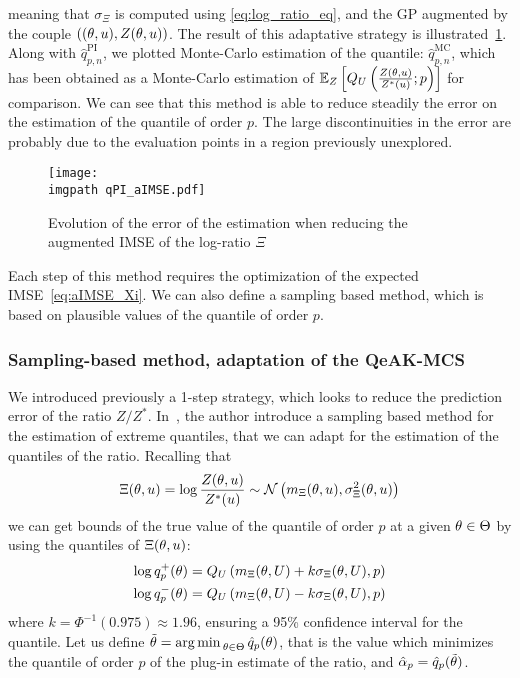 \documentclass[../../Main_ManuscritThese.tex]{subfiles}
\newcommand\imgpath{/home/victor/acadwriting/Manuscrit/Text/Chapter4/img/}
\begin{document}
meaning that $\sigma_{\Xi}$ is computed using \cref{eq:log_ratio_eq},
and the GP augmented by the couple
$\left((\theta, u), Z(\theta, u)\right)$.  The result of this adaptative
strategy is illustrated~\cref{fig:qPI_aIMSE}. Along with
$\hat{q}_{p,n}^{\mathrm{PI}}$, we plotted Monte-Carlo estimation of
the quantile: $\hat{q}_{p,n}^{\mathrm{MC}}$, which has been obtained
as a Monte-Carlo estimation of
$\mathbb{E}_{Z}\left[Q_{U}\left(\frac{Z(\theta,
      u)}{Z^*(u)};p\right)\right]$ for comparison.  We can see that
this method is able to reduce steadily the error on the estimation of
the quantile of order $p$. The large discontinuities in the error are
probably due to the evaluation points in a region previously
unexplored.
\begin{figure}[ht]
  \centering
  \texttt{[image: \\imgpath qPI\_aIMSE.pdf]}
  \caption{\label{fig:qPI_aIMSE} Evolution of the error of the estimation when reducing the augmented IMSE of the log-ratio $\Xi$}
\end{figure}

Each step of this method requires the optimization of the expected
IMSE~\cref{eq:aIMSE_Xi}. We can also define a sampling based method,
which is based on plausible values of the quantile of order $p$.

\subsubsection{Sampling-based method, adaptation of the QeAK-MCS}
\label{ssec:quantile_qeakmcs}
We introduced previously a 1-step strategy, which looks to reduce the
prediction error of the ratio
$Z/Z^*$. In~\cite{razaaly_rare_2019,razaaly_quantile-based_2020}, the
author introduce a sampling based method for the estimation of extreme
quantiles, that we can adapt for the estimation of the quantiles of
the ratio.  Recalling that
\begin{equation}
  \Xi(\theta, u) = \log\frac{Z(\theta, u)}{Z^*(u)} \sim \mathcal{N}\left(m_{\Xi}(\theta, u),\sigma^2_{\Xi}(\theta, u)\right)
\end{equation}
we can get bounds of the true value of the quantile of order $p$ at a
given $\theta\in\Theta$ by using the quantiles of $\Xi(\theta, u)$:
\begin{align}
  \log q_p^{+}(\theta) = Q_{U}\left(m_{\Xi}(\theta, U) + k \sigma_{\Xi}(\theta, U), p\right) \\
  \log q_p^{-}(\theta) = Q_{U}\left(m_{\Xi}(\theta, U) - k \sigma_{\Xi}(\theta, U), p\right)
\end{align}
where $k = \Phi^{-1}(0.975)\approx 1.96$, ensuring a 95\% confidence
interval for the quantile.  Let us define
$\tilde{\theta}=\operatorname*{arg\,min \,}_{\theta \in\Theta} \hat{q}_p(\theta)$, that is the
value which minimizes the quantile of order $p$ of the plug-in
estimate of the ratio, and $\hat{\alpha}_p = \hat{q}_p(\tilde{\theta})$.
\end{document}

